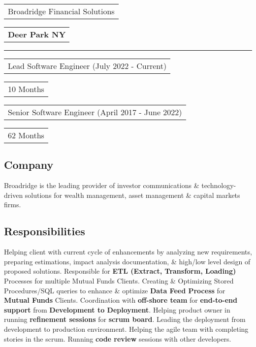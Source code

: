 \documentclass[letterpaper,10pt]{article}
\begin{document}

    \vspace{0.64cm}
    \noindent
    \begin{tabular}[t]{@{}l}
    \Large{Broadridge Financial Solutions}
    \end{tabular}
    \hfill
    \begin{tabular}[t]{l@{}}
    \textbf{Deer Park NY}
    \end{tabular}
    \noindent\rule{\textwidth}{0.5pt}
    \begin{tabular}[t]{@{}l}
    Lead Software Engineer (July 2022 - Current)
    \end{tabular}
    \hfill
    \begin{tabular}[t]{l@{}}
    10 Months
    \end{tabular}
    \begin{tabular}[t]{@{}l}
    Senior Software Engineer (April 2017 - June 2022)
    \end{tabular}
    \hfill
    \begin{tabular}[t]{l@{}}
    62 Months
    \end{tabular}

    \subsection{Company}
    Broadridge is the leading provider of investor communications \& technology-driven solutions for wealth management, asset management \& capital markets firms.

    \subsection{Responsibilities}
    Helping client with current cycle of enhancements by analyzing new requirements, preparing estimations, impact analysis documentation, \& high/low level design of proposed solutions. Responsible for \textbf{ETL (Extract, Transform, Loading)} Processes for multiple Mutual Funds Clients. Creating \& Optimizing Stored Procedures/SQL queries to enhance \& optimize \textbf{Data Feed Process} for \textbf{Mutual Funds} Clients. Coordination with \textbf{off-shore team} for \textbf{end-to-end support} from \textbf{Development to Deployment}. Helping product owner in running \textbf{refinement sessions} for \textbf{scrum board}. Leading the deployment from development to production environment. Helping the agile team with completing stories in the scrum. Running \textbf{code review} sessions with other developers.
\end{document}
